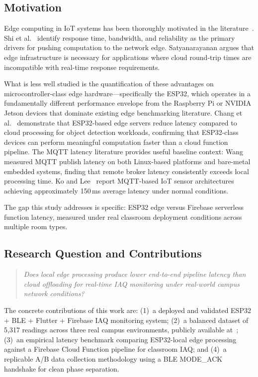\documentclass[12pt, a4paper]{article}
\newcommand{\ms}{\,ms}
\begin{document}
\subsection{Motivation}

Edge computing in IoT systems has been thoroughly motivated in the
literature~\cite{shi2016,satya2017}. Shi et al.~\cite{shi2016}
identify response time, bandwidth, and reliability as the primary
drivers for pushing computation to the network edge. Satyanarayanan
\cite{satya2017} argues that edge infrastructure is necessary for
applications where cloud round-trip times are incompatible with
real-time response requirements.

What is less well studied is the quantification of these advantages on
microcontroller-class edge hardware---specifically the ESP32, which
operates in a fundamentally different performance envelope from the
Raspberry Pi or NVIDIA Jetson devices that dominate existing edge
benchmarking literature. Chang et al.~\cite{chang2025} demonstrate
that ESP32-based edge servers reduce latency compared to cloud
processing for object detection workloads, confirming that ESP32-class
devices can perform meaningful computation faster than a cloud function
pipeline. The MQTT latency literature provides useful baseline context:
Wang~\cite{wang2021} measured MQTT publish latency on both Linux-based
platforms and bare-metal embedded systems, finding that remote broker
latency consistently exceeds local processing time. Ko and
Lee~\cite{ko2025} report MQTT-based IoT sensor architectures achieving
approximately 150\ms{} average latency under normal conditions.

The gap this study addresses is specific: ESP32 edge versus Firebase
serverless function latency, measured under real classroom deployment
conditions across multiple room types.

\subsection{Research Question and Contributions}

\begin{quote}
\textit{Does local edge processing produce lower end-to-end pipeline
latency than cloud offloading for real-time IAQ monitoring under
real-world campus network conditions?}
\end{quote}

The concrete contributions of this work are: (1)~a deployed and
validated ESP32 + BLE + Flutter + Firebase IAQ monitoring system;
(2)~a balanced dataset of 5{,}317 readings across three real campus
environments, publicly available at~\cite{dataset2026};
(3)~an empirical latency benchmark comparing ESP32-local edge
processing against a Firebase Cloud Function pipeline for classroom
IAQ; and (4)~a replicable A/B data collection methodology using a BLE
MODE\_ACK handshake for clean phase separation.
\end{document}
